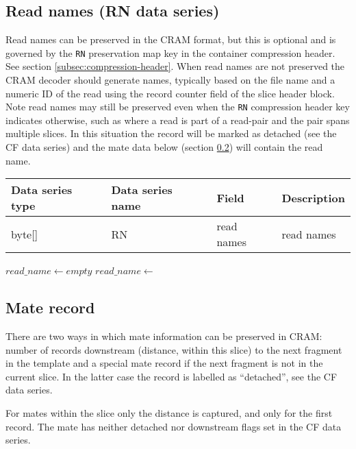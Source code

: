 \documentclass[a4paper]{article}
\begin{document}
\subsection{Read names (RN data series)}
\label{subsec:names}

Read names can be preserved in the CRAM format, but this is optional and is governed by the \texttt{RN} preservation map key in the container compression header. See section \ref{subsec:compression-header}.
When read names are not preserved the CRAM decoder should generate names, typically based on the file name and a numeric ID of the read using the record counter field of the slice header block.
Note read names may still be preserved even when the \texttt{RN} compression header key indicates otherwise, such as where a read is part of a read-pair and the pair spans multiple slices.
In this situation the record will be marked as detached (see the CF data series) and the mate data below (section \ref{subsec:mate}) will contain the read name.

\begin{tabular}{|>{\raggedright}p{70pt}|>{\raggedright}p{75pt}|>{\raggedright}p{90pt}|>{\raggedright}p{171pt}|}
\hline
\textbf{Data series type} & \textbf{Data series name} & \textbf{Field} & \textbf{Description}\tabularnewline
\hline
byte[] & RN & read names & read names\tabularnewline
\hline
\end{tabular}

\vskip 20pt
\begin{algorithmic}[1]
\State $read\_name \gets empty$
  \State $read\_name \gets$ 
\EndIf
\Statex
\EndProcedure
\end{algorithmic}

\subsection{\textbf{Mate record}}
\label{subsec:mate}

There are two ways in which mate information can be preserved in CRAM: number of records downstream (distance, within this slice) to the next fragment in the template and a special mate record if the next fragment is not in the current slice.
In the latter case the record is labelled as ``detached'', see the CF data series.

For mates within the slice only the distance is captured, and only for the first record.  The mate has neither detached nor downstream flags set in the CF data series.
\end{document}
